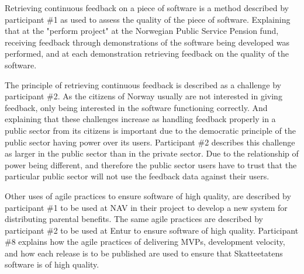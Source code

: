 Retrieving continuous feedback on a piece of software is a method described by participant \#1 as used to assess the quality of the piece of software. Explaining that at the "perform project" at the Norwegian Public Service Pension fund, receiving feedback through demonstrations of the software being developed was performed, and at each demonstration retrieving feedback on the quality of the software.


The principle of retrieving continuous feedback is described as a challenge by participant \#2. As the citizens of Norway usually are not interested in giving feedback, only being interested in the software functioning correctly. And explaining that these challenges increase as handling feedback properly in a public sector from its citizens is important due to the democratic principle of the public sector having power over its users. Participant \#2 describes this challenge as larger in the public sector than in the private sector. Due to the relationship of power being different, and therefore the public sector users have to trust that the particular public sector will not use the feedback data against their users.


Other uses of agile practices to ensure software of high quality, are described by participant \#1 to be used at NAV in their project to develop a new system for distributing parental benefits. The same agile practices are described by participant \#2 to be used at Entur to ensure software of high quality. Participant \#8 explains how the agile practices of delivering MVPs, development velocity, and how each release is to be published are used to ensure that Skatteetatens software is of high quality.

